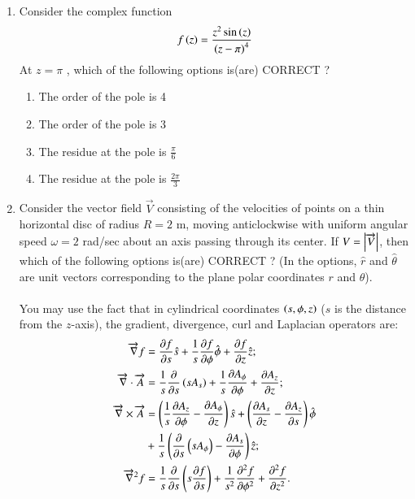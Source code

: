 \documentclass[journal]{IEEEtran}
\begin{document}
\begin{enumerate}
\begin{enumerate}
\end{enumerate}
\item Consider the complex function
\begin{align*}
    f\left(z\right) = \frac{z^2\sin\left(z\right)}{\left(z - \pi\right)^4}
\end{align*}
At $z = \pi$ , which of the following options is(are) CORRECT ?
\begin{enumerate}
    \item The order of the pole is 4
    \item The order of the pole is 3
    \item The residue at the pole is $\frac{\pi}{6}$
    \item The residue at the pole is $\frac{2\pi}{3}$ \\
\end{enumerate}
\item Consider the vector field $\overrightarrow{V}$ consisting of the velocities of points on a thin horizontal disc of radius $R = 2$ m, moving anticlockwise with uniform angular speed $\omega = 2$ rad/sec about an axis passing through its center. If $V = \left\vert\overrightarrow{V}\right\vert$, then which of the following options is(are) CORRECT ? (In the options, $\hat{r}$ and $\hat{\theta}$ are unit vectors corresponding to the plane polar coordinates $r$ and $\theta$).\\\\
You may use the fact that in cylindrical coordinates $\left(s, \phi, z\right)$ ($s$ is the distance from the $z$-axis), the gradient, divergence, curl and Laplacian operators are:
\begin{align*}
    \overrightarrow{\nabla}f & = \frac{\partial f}{\partial s}\hat{s} + \frac{1}{s}\frac{\partial f}{\partial \phi}\hat{\phi} + \frac{\partial f}{\partial z}\hat{z}; \\
\overrightarrow{\nabla}\cdot\overrightarrow{A} & = \frac{1}{s}\frac{\partial}{\partial s}\brak{sA_s} + \frac{1}{s}\frac{\partial A_{\phi}}{\partial \phi} + \frac{\partial A_z}{\partial z}; \\
\overrightarrow{\nabla}\times\overrightarrow{A} & = \brak{\frac{1}{s} \frac{\partial A_z}{\partial \phi} - \frac{\partial A_{\phi}}{\partial z}}\hat{s} + \brak{\frac{\partial A_s}{\partial z} - \frac{\partial A_z}{\partial s}}\hat{\phi} \\
& + \frac{1}{s}\brak{\frac{\partial}{\partial s}\brak{sA_{\phi}} - \frac{\partial A_s}{\partial \phi}}\hat{z}; \\
\overrightarrow{\nabla}^2f & = \frac{1}{s}\frac{\partial}{\partial s}\brak{s \frac{\partial f}{\partial s}} + \frac{1}{s^2}\frac{\partial^2 f}{\partial \phi^2} + \frac{\partial^2 f}{\partial z^2}.

\end{align*}
\end{enumerate}
\end{document}
